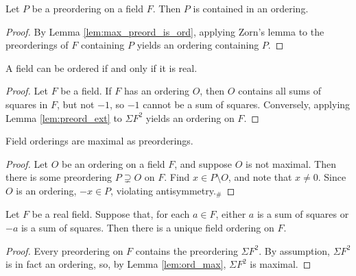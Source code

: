 \begin{lemma}
  \label{lem:preord_ext}
  \leanok
  Let $P$ be a preordering on a field $F$. Then $P$ is contained in an ordering.
\end{lemma}
\begin{proof}
  \leanok
  By Lemma \ref{lem:max_preord_is_ord}, applying Zorn's lemma to the preorderings of $F$ containing $P$ yields an ordering containing $P$.
\end{proof}

\begin{theorem}
  \label{thm:ord_iff_real}
  \leanok
  A field can be ordered if and only if it is real.
\end{theorem}
\begin{proof}
  \leanok
  Let $F$ be a field. If $F$ has an ordering $O$, then $O$ contains all sums of squares in $F$, but not $-1$, so $-1$ cannot be a sum of squares. Conversely, applying Lemma \ref{lem:preord_ext} to $\Sigma F^2$ yields an ordering on $F$.
\end{proof}

\begin{lemma}
  \label{lem:ord_max}
  \leanok
  Field orderings are maximal as preorderings.
\end{lemma}
\begin{proof}
  \leanok
  Let $O$ be an ordering on a field $F$, and suppose $O$ is not maximal. Then there is some preordering $P\supsetneq O$ on $F$. Find $x\in P\setminus O$, and note that $x\neq0$. Since $O$ is an ordering, $-x\in P$, violating antisymmetry.$_\#$
\end{proof}

\begin{lemma}
  \label{lem:unique_ord_cond}
  \leanok
  Let $F$ be a real field. Suppose that, for each $a\in F$, either $a$ is a sum of squares or $-a$ is a sum of squares. Then there is a unique field ordering on $F$.
\end{lemma}
\begin{proof}
  \leanok
  Every preordering on $F$ contains the preordering $\Sigma F^2$. By assumption, $\Sigma F^2$ is in fact an ordering, so, by Lemma \ref{lem:ord_max}, $\Sigma F^2$ is maximal.
\end{proof}

